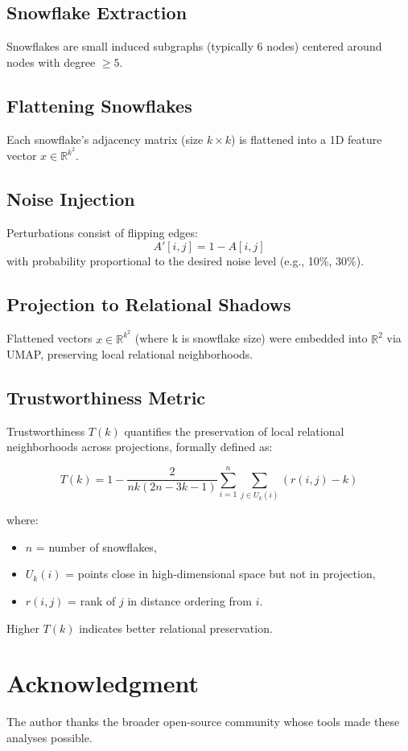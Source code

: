 \documentclass[conference]{IEEEtran}
\begin{document}
\subsection{Snowflake Extraction}
Snowflakes are small induced subgraphs (typically 6 nodes) centered around nodes with degree $\geq5$.

\subsection{Flattening Snowflakes}
Each snowflake's adjacency matrix (size $k \times k$) is flattened into a 1D feature vector $x \in \mathbb{R}^{k^2}$.

\subsection{Noise Injection}
Perturbations consist of flipping edges:
\[
A'[i,j] = 1 - A[i,j]
\]
with probability proportional to the desired noise level (e.g., 10\%, 30\%).

\subsection{Projection to Relational Shadows}
Flattened vectors $x \in \mathbb{R}^{k^2}$ (where k is snowflake size) were embedded into $\mathbb{R}^2$ via UMAP, preserving local relational neighborhoods.

\subsection{Trustworthiness Metric}
Trustworthiness $T(k)$ quantifies the preservation of local relational neighborhoods across projections, formally defined as:

\[
T(k) = 1 - \frac{2}{n k (2n - 3k -1)} \sum_{i=1}^n \sum_{j \in U_k(i)} (r(i,j) - k)
\]

where:
\begin{itemize}
    \item $n$ = number of snowflakes,
    \item $U_k(i)$ = points close in high-dimensional space but not in projection,
    \item $r(i,j)$ = rank of $j$ in distance ordering from $i$.
\end{itemize}

Higher $T(k)$ indicates better relational preservation.

\section*{Acknowledgment}
The author thanks the broader open-source community whose tools made these analyses possible.
\end{document}
